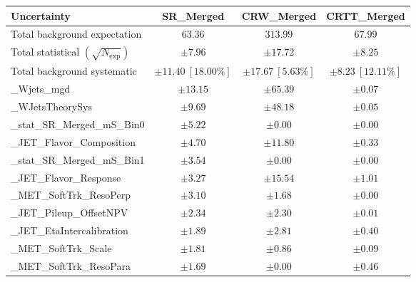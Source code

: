 		\begin{table}[h]
		\centering
		\small
		\begin{tabular*}{\textwidth}{@{\extracolsep{\fill}}lccc}
		\toprule
		\textbf{Uncertainty}                                    & SR\_Merged            & CRW\_Merged            & CRTT\_Merged            \\
		\midrule
		Total background expectation             &  $63.36$        &  $313.99$        &  $67.99$       \\
		\midrule
		Total statistical $(\sqrt{N_{\mathrm{exp}}})$              & $\pm 7.96$        & $\pm 17.72$        & $\pm 8.25$       \\
		Total background systematic               & $\pm 11.40\ [18.00\%] $        & $\pm 17.67\ [5.63\%] $        & $\pm 8.23\ [12.11\%] $             \\
		\midrule
		\mu\_Wjets\_mgd         & $\pm 13.15$          & $\pm 65.39$          & $\pm 0.07$       \\
		\alpha\_WJetsTheorySys         & $\pm 9.69$          & $\pm 48.18$          & $\pm 0.05$       \\
		\gamma\_stat\_SR\_Merged\_mS\_Bin0         & $\pm 5.22$          & $\pm 0.00$          & $\pm 0.00$       \\
		\alpha\_JET\_Flavor\_Composition         & $\pm 4.70$          & $\pm 11.80$          & $\pm 0.33$       \\
		\gamma\_stat\_SR\_Merged\_mS\_Bin1         & $\pm 3.54$          & $\pm 0.00$          & $\pm 0.00$       \\
		\alpha\_JET\_Flavor\_Response         & $\pm 3.27$          & $\pm 15.54$          & $\pm 1.01$       \\
		\alpha\_MET\_SoftTrk\_ResoPerp         & $\pm 3.10$          & $\pm 1.68$          & $\pm 0.00$       \\
		\alpha\_JET\_Pileup\_OffsetNPV         & $\pm 2.34$          & $\pm 2.30$          & $\pm 0.01$       \\
		\alpha\_JET\_EtaIntercalibration        & $\pm 1.89$          & $\pm 2.81$          & $\pm 0.40$       \\
		\alpha\_MET\_SoftTrk\_Scale         & $\pm 1.81$          & $\pm 0.86$          & $\pm 0.09$       \\
		\alpha\_MET\_SoftTrk\_ResoPara         & $\pm 1.69$          & $\pm 0.00$          & $\pm 0.46$       \\

\end{tabular*}
\end{table}
